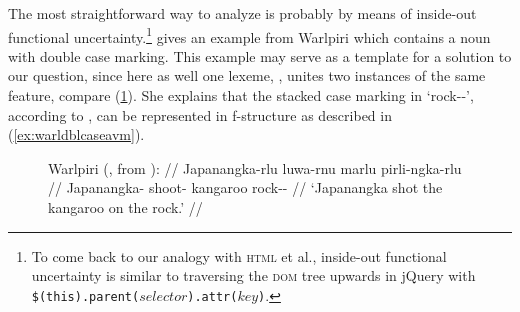 

The most straightforward way to analyze  is
probably by means of inside-out functional uncertainty.\footnote{To come back
to our analogy with \textsc{html} et al., inside-out functional uncertainty is
similar to traversing the \textsc{dom} tree upwards in jQuery with
\texttt{\$(this).parent($selector$).attr($key$)}.} \citet[144]{dalrymple2001}
gives an example from Warlpiri which contains a noun with double case marking.
This example may serve as a template for a solution to our question, since here
as well one lexeme, , unites two instances of the same
feature, compare (\ref{ex:warldblcase}). She explains that the stacked case
marking in  `rock-\Loc {}-\Erg{}', according to
\citet{nordlinger1998}, can be represented in f-structure as described in
(\ref{ex:warldblcaseavm}).

\begin{figure}
\ex\label{ex:warldblcase}
\begingl
	\glpreamble Warlpiri (\cite[136]{nordlinger1998}, from 
		\cite{simpson1991}): //
	\gla Japanangka-rlu luwa-rnu marlu pirli-ngka-rlu //
	\glb Japanangka-\Erg{} shoot-\Pst{} kangaroo rock-\Loc{}-\Erg{} //
	\glft `Japanangka shot the kangaroo on the rock.' //
\endgl\xe
\end{figure}

